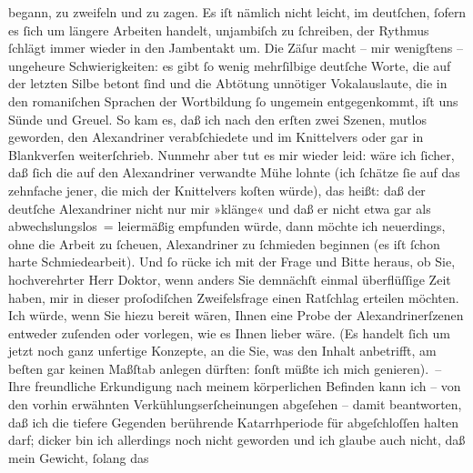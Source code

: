 \begin{ledgroupsized}[t]{13cm}
               begann, zu zweifeln und zu zagen. Es iſt nämlich nicht leicht, im deutſchen, ſofern
               es ſich um längere Arbeiten handelt, unjambiſch zu ſchreiben, der Rythmus ſchlägt
               immer wieder in den Jambentakt um. Die Zäſur macht – mir wenigſtens – ungeheure
               Schwierigkeiten: es gibt ſo wenig 
               mehrſilbige deutſche Worte, die auf der letzten Silbe betont {\pb}ſind und die Abtötung unnötiger Vokalauslaute, die in
               den romaniſchen Sprachen der Wortbildung ſo ungemein entgegenkommt, iſt uns Sünde und Greuel. So kam es, daß ich nach
               den erſten zwei Szenen, mutlos geworden, den Alexandriner verabſchiedete und im
               Knittelvers oder gar in Blankverſen weiterſchrieb. Nunmehr aber tut es mir wieder
               leid: wäre ich ſicher, daß ſich die auf den Alexandriner verwandte Mühe lohnte (ich
               ſchätze ſie auf das zehnfache jener, die mich der Knittelvers koſten würde), das
               heißt: daß der deutſche Alexandriner nicht nur mir »klänge« und daß er nicht etwa gar
               als abwechslungslos = leiermäßig empfunden würde, dann möchte ich neuerdings, ohne
               die Arbeit zu ſcheuen, Alexandriner zu ſchmieden beginnen (es iſt ſchon harte
               Schmiedearbeit).\pend
           \pstart
           Und ſo rücke ich mit der Frage und Bitte heraus, ob Sie, hochverehrter Herr Doktor,
               wenn anders Sie demnächſt einmal überflüſſige Zeit haben, mir {\pb}in dieser proſodiſchen Zweifelsfrage einen Ratſchlag
               erteilen möchten. Ich würde, wenn Sie hiezu bereit wären, Ihnen eine Probe der
               Alexandrinerſzenen entweder zuſenden oder vorlegen, wie es Ihnen lieber wäre. (Es
               handelt ſich um jetzt noch ganz unfertige Konzepte, an die Sie, was den Inhalt
               anbetrifft, am beſten gar keinen Maßſtab anlegen dürften: ſonſt müßte ich mich
               genieren). –\pend
           \pstart
           Ihre freundliche Erkundigung nach meinem körperlichen Befinden kann ich – von den
               vorhin erwähnten Verkühlungserſcheinungen abgeſehen – damit beantworten, daß ich die
               tiefere Gegenden berührende Katarrhperiode für
               abgeſchloſſen halten darf; dicker bin ich allerdings noch nicht geworden und ich
               glaube auch nicht, daß mein Gewicht, ſolang das \label{K_L02246-1v}
\end{ledgroupsized}
